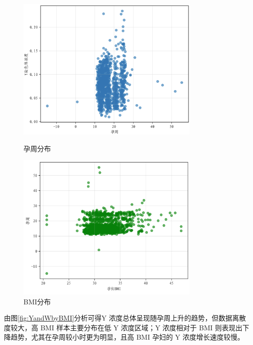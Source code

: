 \documentclass[withoutpreface,bwprint]{cumcmthesis} %
\begin{document}
\begin{figure}[H]
    \centering
    \begin{minipage}{0.49\textwidth}
        \includegraphics[width=0.8\textwidth]{../figure/C1_Output/q1_week_Yconc.png}
        \caption{孕周分布}
        \label{fig:孕周分布}
    \end{minipage}
    \begin{minipage}{0.49\textwidth}
        \includegraphics[width=0.8\textwidth]{../figure/C1_Output/q1_week_BMI.png}
        \caption{BMI分布}
        \label{fig:BMI分布}
    \end{minipage}
\end{figure}

由图\ref{fig:YandWbyBMI}分析可得Y 浓度总体呈现随孕周上升的趋势，但数据离散度较大，高 BMI 样本主要分布在低 Y 浓度区域；Y 浓度相对于 BMI 则表现出下降趋势，尤其在孕周较小时更为明显，且高 BMI 孕妇的 Y 浓度增长速度较慢。
\end{document}
